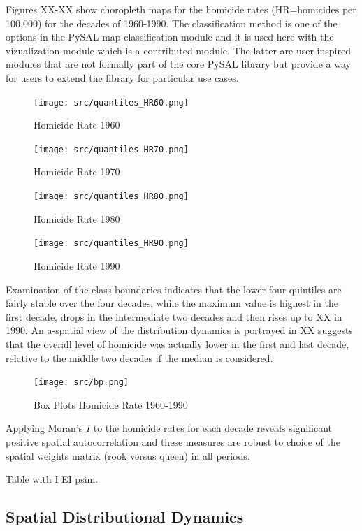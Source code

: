 \documentclass[11pt, titlepage]{article}
\begin{document}
Figures XX-XX show choropleth maps for the homicide rates (HR=homicides
per 100,000) for the decades of 1960-1990. The classification method is
one of the options in the PySAL map classification module and it is used
here with the vizualization module which is a contributed module. The
latter are user inspired modules that are not formally part of the core
PySAL library but provide a way for users to extend the library for
particular use cases.

\begin{figure}[htbp]
\centering
\texttt{[image: src/quantiles\_HR60.png]}
\caption{Homicide Rate 1960}
\end{figure}

\begin{figure}[htbp]
\centering
\texttt{[image: src/quantiles\_HR70.png]}
\caption{Homicide Rate 1970}
\end{figure}

\begin{figure}[htbp]
\centering
\texttt{[image: src/quantiles\_HR80.png]}
\caption{Homicide Rate 1980}
\end{figure}

\begin{figure}[htbp]
\centering
\texttt{[image: src/quantiles\_HR90.png]}
\caption{Homicide Rate 1990}
\end{figure}

Examination of the class boundaries indicates that the lower four
quintiles are fairly stable over the four decades, while the maximum
value is highest in the first decade, drops in the intermediate two
decades and then rises up to XX in 1990. An a-spatial view of the
distribution dynamics is portrayed in XX suggests that the overall level
of homicide was actually lower in the first and last decade, relative to
the middle two decades if the median is considered.

\begin{figure}[htbp]
\centering
\texttt{[image: src/bp.png]}
\caption{Box Plots Homicide Rate 1960-1990}
\end{figure}


Applying Moran's $I$ to the homicide rates for each decade reveals
significant positive spatial autocorrelation and these measures are
robust to choice of the spatial weights matrix (rook versus queen) in
all periods.

Table with I EI psim.

\subsection{Spatial Distributional Dynamics}
\end{document}
